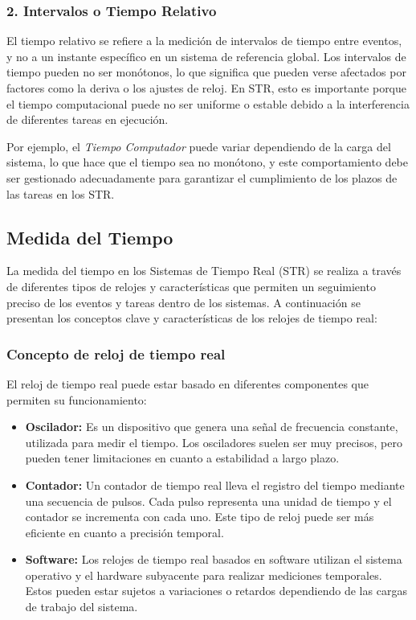 \subsubsection{2. Intervalos o Tiempo Relativo}
El tiempo relativo se refiere a la medición de intervalos de tiempo entre eventos, y no a un instante específico en un sistema de referencia global. Los intervalos de tiempo pueden no ser monótonos, lo que significa que pueden verse afectados por factores como la deriva o los ajustes de reloj. En STR, esto es importante porque el tiempo computacional puede no ser uniforme o estable debido a la interferencia de diferentes tareas en ejecución.

Por ejemplo, el \textit{Tiempo Computador} puede variar dependiendo de la carga del sistema, lo que hace que el tiempo sea no monótono, y este comportamiento debe ser gestionado adecuadamente para garantizar el cumplimiento de los plazos de las tareas en los STR.

\subsection{Medida del Tiempo}

La medida del tiempo en los Sistemas de Tiempo Real (STR) se realiza a través de diferentes tipos de relojes y características que permiten un seguimiento preciso de los eventos y tareas dentro de los sistemas. A continuación se presentan los conceptos clave y características de los relojes de tiempo real:

\subsubsection{Concepto de reloj de tiempo real}
El reloj de tiempo real puede estar basado en diferentes componentes que permiten su funcionamiento:

\begin{itemize}
    \item \textbf{Oscilador:} Es un dispositivo que genera una señal de frecuencia constante, utilizada para medir el tiempo. Los osciladores suelen ser muy precisos, pero pueden tener limitaciones en cuanto a estabilidad a largo plazo.
    \item \textbf{Contador:} Un contador de tiempo real lleva el registro del tiempo mediante una secuencia de pulsos. Cada pulso representa una unidad de tiempo y el contador se incrementa con cada uno. Este tipo de reloj puede ser más eficiente en cuanto a precisión temporal.
    \item \textbf{Software:} Los relojes de tiempo real basados en software utilizan el sistema operativo y el hardware subyacente para realizar mediciones temporales. Estos pueden estar sujetos a variaciones o retardos dependiendo de las cargas de trabajo del sistema.
\end{itemize}


